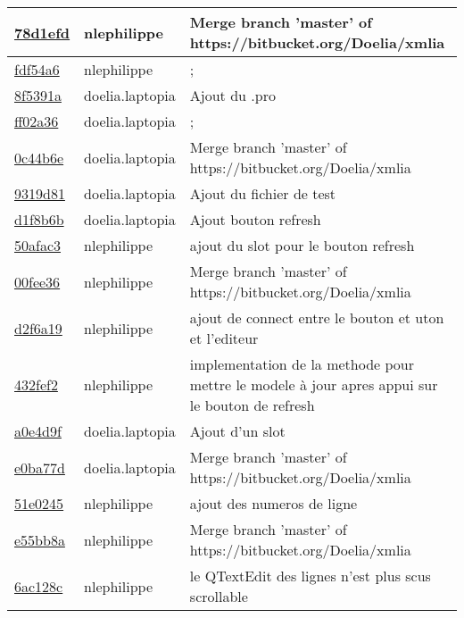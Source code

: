\begin{tabular}{l l l}
\href{78d1efdc67ecdd5086bbdcfd7ab90957eb7455bf}{78d1efd} & nlephilippe & Merge branch 'master' of https://bitbucket.org/Doelia/xmlia\\\hline
\href{fdf54a619b98b2104e593f1bcc9008abc3ce474b}{fdf54a6} & nlephilippe & ;\\\hline
\href{8f5391afa09207e8872751b0255ed6e5a80cd6d6}{8f5391a} & doelia.laptopia & Ajout du .pro\\\hline
\href{ff02a3675e63d06bb826666a0b7284563be2afe7}{ff02a36} & doelia.laptopia & ;\\\hline
\href{0c44b6e7701a906318a1d4622d2630e22ab4d78f}{0c44b6e} & doelia.laptopia & Merge branch 'master' of https://bitbucket.org/Doelia/xmlia\\\hline
\href{9319d8170dcf1d8916ac8822ae84062d334f8939}{9319d81} & doelia.laptopia & Ajout du fichier de test\\\hline
\href{d1f8b6bf121c8b418782d51ea398bb15d9b894ed}{d1f8b6b} & doelia.laptopia & Ajout bouton refresh\\\hline
\href{50afac3eda16b7cebc1ba4aecff992ef6aa353e3}{50afac3} & nlephilippe & ajout du slot pour le bouton refresh\\\hline
\href{00fee363c21418cc45d0646886a84d78e1663a19}{00fee36} & nlephilippe & Merge branch 'master' of https://bitbucket.org/Doelia/xmlia\\\hline
\href{d2f6a1965f7c9742afd5bc2b4a61b9bcea28ce0c}{d2f6a19} & nlephilippe & ajout de connect entre le bouton et uton et l'editeur\\\hline
\href{432fef23b5a99541f9a3e2779ed37e18a0d772f5}{432fef2} & nlephilippe & implementation de la methode pour mettre le modele à jour apres appui sur le bouton de refresh\\\hline
\href{a0e4d9f9f7ecfef60d2a594fbfcea6fd665dc86c}{a0e4d9f} & doelia.laptopia & Ajout d'un slot\\\hline
\href{e0ba77d8448dddaca4270a13b69d079fd6743cc8}{e0ba77d} & doelia.laptopia & Merge branch 'master' of https://bitbucket.org/Doelia/xmlia\\\hline
\href{51e0245e6fdbdd9836495b5152c4229fb733581e}{51e0245} & nlephilippe & ajout des numeros de ligne\\\hline
\href{e55bb8a89a5065288a1dae888149e01a2a2185aa}{e55bb8a} & nlephilippe & Merge branch 'master' of https://bitbucket.org/Doelia/xmlia\\\hline
\href{6ac128c4bc04915e809bce33e698a8b90bea1af8}{6ac128c} & nlephilippe & le QTextEdit des lignes n'est plus scus scrollable\\\hline

\end{tabular}
